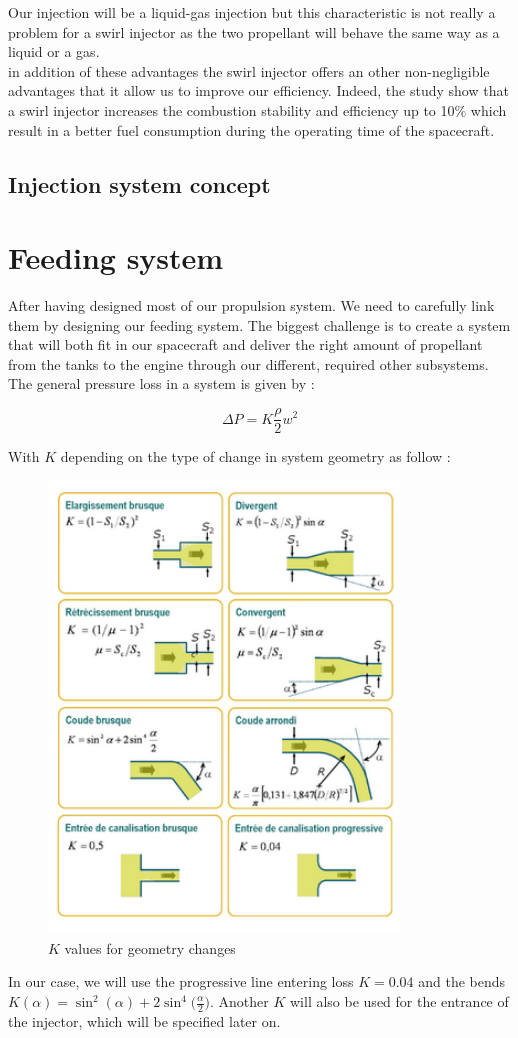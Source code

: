 Our injection will be a liquid-gas injection but this characteristic is not really a problem for a swirl injector as the two propellant will behave the same way as a liquid or a gas.\\

in addition of these advantages the swirl injector offers an other non-negligible advantages that it allow us to improve our efficiency. Indeed, the study show that a swirl injector increases the combustion stability and efficiency up to 10$\%$ which result in a better fuel consumption during the operating time of the spacecraft. 

\subsection{Injection system concept}

\section{Feeding system}
After having designed most of our propulsion system. We need to carefully link them by designing our feeding system. The biggest challenge is to create a system that will both fit in our spacecraft and deliver the right amount of propellant from the tanks to the engine through our different, required other subsystems.\\

The general pressure loss in a system is given by :

$$
\Delta P = K\frac \rho 2 w^2
$$

With $K$ depending on the type of change in system geometry as follow : 
\begin{figure}[H]
	\centering
	\includegraphics[height=12cm]{pertecharge}
	\caption{$K$ values for geometry changes}
\end{figure}
In our case, we will use the progressive line entering loss $K = 0.04$ and the bends $ K(\alpha) = \sin^2(\alpha) + 2\sin^4\bigg(\frac\alpha 2\bigg)$. Another $K$ will also be used for the entrance of the injector, which will be specified later on.\\

